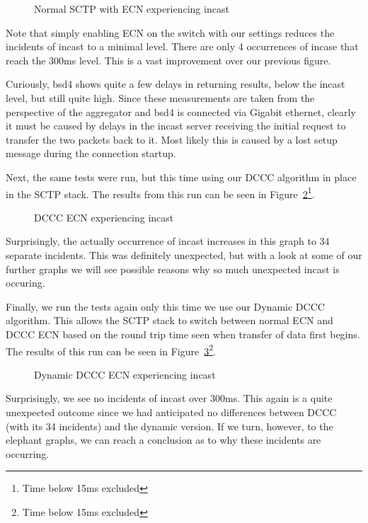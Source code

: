 \documentclass[12pt]{article}
\begin{document}
\begin{figure}[h]
\centering
{}
\caption{Normal SCTP with ECN experiencing incast}
\label{fig:ecnIncast}
\end{figure}

Note that simply enabling ECN on the switch with our settings reduces the incidents of incast to a minimal
level. There are only 4 occurrences of incase that reach the 300ms level. This is a vast improvement over
our previous figure.  

Curiously,  bsd4 shows quite a few delays in returning results, below the incast level, 
but still quite high. Since these measurements are taken from the perspective of the aggregator and
bsd4 is connected via Gigabit ethernet, clearly it must be caused by delays in the incast server
receiving the initial request to transfer the two packets back to it. Most likely this is caused by
a lost setup message during the connection startup.

\newpage

Next, the same tests were run, but this time using our DCCC algorithm in place in the SCTP stack. The
results from this run can be seen in Figure~\ref{fig:dcccIncast}\footnote{Time below 15ms excluded}.

\begin{figure}[h]
\centering
{}
\caption{DCCC ECN experiencing incast}
\label{fig:dcccIncast}
\end{figure}

Surprisingly, the actually occurrence of incast increases in this graph to 34 separate incidents. This
was definitely unexpected, but with a look at some of our further graphs we will see possible
reasons why so much unexpected incast is occuring.

\newpage

Finally, we run the tests again only this time we use our Dynamic DCCC algorithm. This allows the
SCTP stack to switch between normal ECN and DCCC ECN based on the round trip time
seen when transfer of data first begins. The results of this run can be seen in Figure~\ref{fig:dynIncast}\footnote{Time below 15ms excluded}.


\begin{figure}[h]
\centering
{}
\caption{Dynamic DCCC ECN experiencing incast}
\label{fig:dynIncast}
\end{figure}

Surprisingly, we see no incidents of incast over 300ms. This again is a quite unexpected
outcome since we had anticipated no differences between DCCC (with its 34 incidents) and
the dynamic version. If we turn, however, to the elephant graphs, we can reach a conclusion
as to why these incidents are occurring.
\end{document}
